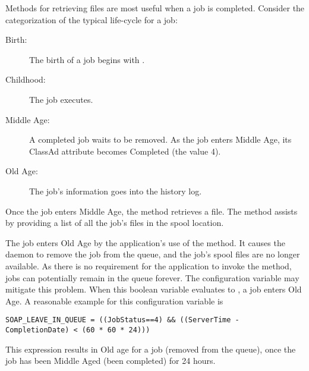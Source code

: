 
Methods for retrieving files are most useful when a job is completed.
Consider the categorization of the typical life-cycle for a job:
\begin{description}
  \item[Birth:]
  The birth of a job begins with .
  \item[Childhood:]
  The job executes.
  \item[Middle Age:]
  A completed job waits to be removed.
  As the job enters Middle Age,
  its  ClassAd attribute becomes Completed (the value 4).
  \item[Old Age:]
  The job's information goes into the history log.
\end{description}

Once the job enters Middle Age,
the  method retrieves a file.
The  method assists by providing
a list of all the job's files in the spool location.

The job enters Old Age by the application's use of the
 method.
It causes  the  daemon to remove the 
job from the queue, 
and the job's spool files are no longer available.
As there is no requirement for the application to invoke
the  method,
jobs can potentially remain in the queue forever.
The configuration variable 
may mitigate this problem.
When this boolean variable evaluates to ,
a job enters Old Age.
A reasonable example for this configuration variable is
\footnotesize
\begin{verbatim}
SOAP_LEAVE_IN_QUEUE = ((JobStatus==4) && ((ServerTime - CompletionDate) < (60 * 60 * 24)))
\end{verbatim}
\normalsize
This expression results in Old age for a job (removed from the queue),
once the job has been Middle Aged (been completed) for 24 hours.


